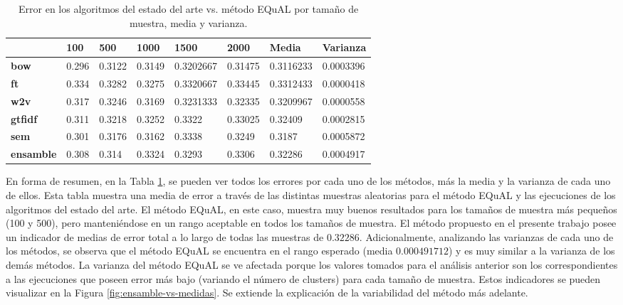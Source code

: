 \begin{table}[h!]
	\footnotesize
	\begin{tabularx}{\textwidth}{XXXXXXXX}
		\toprule
		& \textbf{100} & \textbf{500} & \textbf{1000} & \textbf{1500} & \textbf{2000} & \textbf{Media} & \textbf{Varianza} \\
		\midrule
		\textbf{bow}      & 0.296 & 0.3122 & 0.3149 & 0.3202667 & 0.31475 & \cellcolor[HTML]{D9EAD3}0.3116233 & 0.0003396                          \\
		\textbf{ft}       & 0.334 & 0.3282 & 0.3275 & 0.3320667 & 0.33445 & 0.3312433                         & \cellcolor[HTML]{D9EAD3}0.0000418 \\
		\textbf{w2v}      & 0.317 & 0.3246 & 0.3169 & 0.3231333 & 0.32335 & 0.3209967                         & 0.0000558                         \\
		\textbf{gtfidf}   & 0.311 & 0.3218 & 0.3252 & 0.3322       & 0.33025 & 0.32409                              & 0.0002815                              \\
		\textbf{sem}      & 0.301 & 0.3176 & 0.3162 & 0.3338       & 0.3249  & 0.3187                               & 0.0005872                                \\
		\textbf{ensamble} & 0.308 & 0.314  & 0.3324 & 0.3293       & 0.3306  & 0.32286                              & 0.0004917                              \\
		\bottomrule
	\end{tabularx}
	\caption{Error en los algoritmos del estado del arte vs. método EQuAL por tamaño de muestra, media y varianza.}
	\label{tab:error-arte-equal}
\end{table}

\bigskip En forma de resumen, en la Tabla \ref{tab:error-arte-equal}, se pueden ver todos los errores por cada uno de los métodos, más la media y la varianza de cada uno de ellos. Esta tabla muestra una media de error a través de las distintas muestras aleatorias para el método EQuAL y las ejecuciones de los algoritmos del estado del arte. El método EQuAL, en este caso, muestra muy buenos resultados para los tamaños de muestra más pequeños (100 y 500), pero manteniéndose en un rango aceptable en todos los tamaños de muestra. El método propuesto en el presente trabajo posee un indicador de medias de error total a lo largo de todas las muestras de \(0.32286\). Adicionalmente, analizando las varianzas de cada uno de los métodos, se observa que el método EQuAL se encuentra en el rango esperado (media \(0.000491712\)) y es muy similar a la varianza de los demás métodos. La varianza del método EQuAL se ve afectada porque los valores tomados para el análisis anterior son los correspondientes a las ejecuciones que poseen error más bajo (variando el número de clusters) para cada tamaño de muestra. Estos indicadores se pueden visualizar en la Figura \ref{fig:ensamble-vs-medidas}. Se extiende la explicación de la variabilidad del método más adelante.

